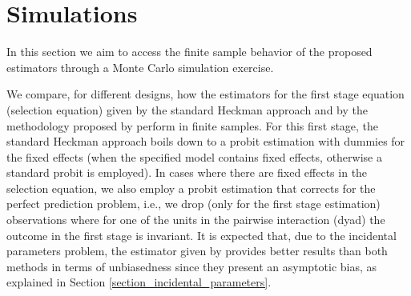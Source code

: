 \section{Simulations} \label{simulations}
In this section we aim to access the finite sample behavior of the proposed estimators through a Monte Carlo simulation exercise.

We compare, for different designs, how the estimators for the first stage equation (selection equation) given by the standard Heckman approach and by the methodology proposed by \cite{charbonneau2017multiple} perform in finite samples. For this first stage, the standard Heckman approach boils down to a probit estimation with dummies for the fixed effects (when the specified model contains fixed effects, otherwise a standard probit is employed). In cases where there are fixed effects in the selection equation, we also employ a probit estimation that corrects for the perfect prediction problem, i.e., we drop (only for the first stage estimation) observations where for one of the units in the pairwise interaction (dyad) the outcome in the first stage is invariant. It is expected that, due to the incidental parameters problem, the estimator given by \cite{charbonneau2017multiple} provides better results than both methods in terms of unbiasedness since they present an asymptotic bias, as explained in Section \ref{section_incidental_parameters}.

